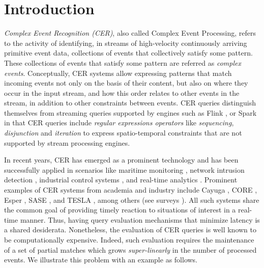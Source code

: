 \chapter{Introduction}\label{chapter:introduction}

\emph{Complex Event Recognition (CER)}, also called Complex Event Processing, refers to the activity of identifying, in streams of high-velocity continuously arriving primitive event data, collections of events that collectively satisfy some pattern.
These collections of events that satisfy some pattern are referred as \emph{complex events}. Conceptually, CER systems allow expressing patterns that match incoming events not only on the basis of their content, but also on where they occur in the input stream, and how this order relates to other events in the stream, in addition to other constraints between events. CER queries distinguish themselves from streaming queries supported by engines such as Flink \cite{flink}, or Spark \cite{spark} in that CER queries include \emph{regular expressions operators} like \emph{sequencing}, \emph{disjunction} and \emph{iteration} to express spatio-temporal constraints that are not supported by stream processing engines.

In recent years, CER has emerged as a prominent technology and has been successfully applied in scenarios like maritime monitoring \cite{maritime-monitoring}, network intrusion detection \cite{network-intrusion-detection}, industrial control systems \cite{industrial-control}, and real-time analytics \cite{real-time-analytics}. Prominent examples of CER systems from academia and industry include Cayuga \cite{cayuga}, CORE \cite{core}, Esper \cite{esper}, SASE \cite{sase}, and TESLA \cite{tesla}, among others (see surveys \cite{survey-systems-1,survey-systems-2}). 
All such systems share the common goal of providing timely reaction to situations of interest in a real-time manner. Thus, having query evaluation mechanisms that minimize latency is a shared desiderata. Nonetheless, the evaluation of CER queries is well known to be computationally expensive. Indeed, such evaluation requires the maintenance of a set of partial matches which grows \textit{super-linearly} in the number of processed events. We illustrate this problem with an example as follows.


